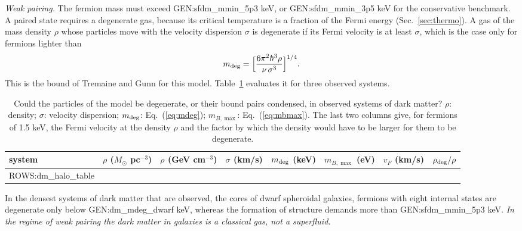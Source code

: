 \emph{Weak pairing.} The fermion mass must exceed {{GEN:sfdm_mmin_5p3}} keV, or
{{GEN:sfdm_mmin_3p5}} keV for the conservative benchmark. A paired state requires a degenerate gas,
because its critical temperature is a fraction of the Fermi energy (Sec.~\ref{sec:thermo}). A gas of
the mass density $\rho$ whose particles move with the velocity dispersion $\sigma$ is degenerate if
its Fermi velocity is at least $\sigma$, which is the case only for fermions lighter than
\begin{equation}
m_{\rm deg}=\Big[\frac{6\pi^2\hbar^3\rho}{\nu\,\sigma^3}\Big]^{1/4}.
\label{eq:mdeg}
\end{equation}
This is the bound of Tremaine and Gunn \cite{TremaineGunn1979} for this model. Table~\ref{tab:halos}
evaluates it for three observed systems.

\begin{table}
\caption{\label{tab:halos}Could the particles of the model be degenerate, or their bound pairs
condensed, in observed systems of dark matter? $\rho$: density; $\sigma$: velocity dispersion;
$m_{\rm deg}$: Eq.~(\ref{eq:mdeg}); $m_{B,\max}$: Eq.~(\ref{eq:mbmax}). The last two columns give,
for fermions of 1.5 keV, the Fermi velocity at the density $\rho$ and the factor by which the density
would have to be larger for them to be degenerate.}
\begin{ruledtabular}
\begin{tabular}{lccccccc}
system & $\rho$ ($M_\odot$ pc$^{-3}$) & $\rho$ (GeV cm$^{-3}$) & $\sigma$ (km/s) & $m_{\rm deg}$ (keV) &
$m_{B,\max}$ (eV) & $v_F$ (km/s) & $\rho_{\rm deg}/\rho$ \\
\hline
{{ROWS:dm_halo_table}}
\end{tabular}
\end{ruledtabular}
\end{table}

In the densest systems of dark matter that are observed, the cores of dwarf spheroidal galaxies,
fermions with eight internal states are degenerate only below {{GEN:dm_mdeg_dwarf}} keV, whereas
the formation of structure demands more than {{GEN:sfdm_mmin_5p3}} keV. \emph{In the regime of weak
pairing the dark matter in galaxies is a classical gas, not a superfluid.}

